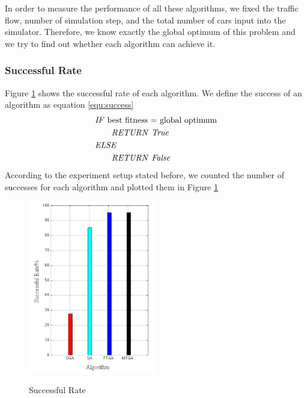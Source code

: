 \documentclass{article} %
\begin{document}
In order to measure the performance of all these algorithms, we fixed the traffic flow, number of simulation step, and the total number of cars input into the simulator. Therefore, we know exactly the global optimum of this problem and we try to find out whether each algorithm can achieve it.


\subsubsection{Successful Rate}
Figure \ref{fig:success_rate} shows the successful rate of each algorithm. We define the success of an algorithm as equation \ref{equ:success}
\begin{equation}
\begin{split}
&\text{\emph{IF} best fitness = global optimum} \\
&\text{\hspace{2em}\emph{RETURN} \emph{True}}\\
&\emph{ELSE}\\
&\text{\hspace{2em}\emph{RETURN} \emph{False}}\\
\label{equ:success}
\end{split}
\end{equation}
According to the experiment setup stated before, we counted the number of successes for each algorithm and plotted them in Figure \ref{fig:success_rate}

\begin{figure}[htbp]
\centering
\includegraphics[width=0.5\textwidth]{images/exp/successful_rate.png}
\label{fig:success_rate}
\caption{Successful Rate}
\end{figure}
\end{document}
